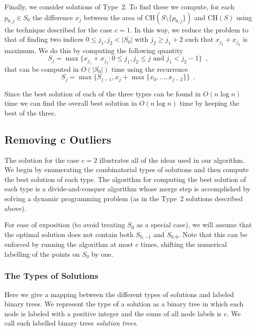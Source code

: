 \documentclass[lotsofwhite]{patmorin}
\newcommand{\ch}{\mathrm{CH}}
\begin{document}
Finally, we consider solutions of Type~2.  To find these we compute,
for each $p_{0,j}\in S_0$ the difference $x_j$ between the area of
$\ch(S\setminus\{p_{0,j}\})$ and $\ch(S)$ using the technique
described for the case $c=1$.  In this way, we reduce the problem to
that of finding two indices $0\le j_1,j_2< |S_0|$ with $j_2\ge j_1+2$
such that $x_{j_1}+x_{j_2}$ is maximum.  We do this by computing the
following quantity
\[
     S_j = \max\{x_{j_1}+x_{j_2} :
       \mbox{$0\le j_1,j_2\le j$ and $j_1 < j_2-1$}\} \enspace ,
\]
that can be computed in $O(|S_0|)$ time using the recurrence
\[
    S_j = \max\{S_{j-1}, x_{j} + \max\{x_{0},\ldots,x_{j-2}\}\}
                \enspace .
\]

Since the best solution of each of the three types can be found in
$O(n\log n)$ time we can find the overall best solution in $O(n\log
n)$ time by keeping the best of the three.

\subsection{Removing $\mathbf{c}$ Outliers}

The solution for the case $c=2$ illustrates all of the ideas used in 
our algorithm.  We begin by enumerating the combinatorial types of
solutions and then compute the best solution of each type.  The
algorithm for computing the best solution of each type is a
divide-and-conquer algorithm whose merge step is accomplished by
solving a dynamic programming problem (as in the Type~2 solutions
described above).

For ease of exposition (to avoid treating $S_0$ as a special case), we
will assume that the optimal solution does not contain both $S_{0,-1}$
and $S_{0,0}$.  Note that this can be enforced by running the
algorithm at most $c$ times, shifting the numerical labelling of the
points on $S_0$ by one.

\subsubsection{The Types of Solutions}

Here we give a mapping between the different types of solutions and
labeled binary trees. We represent the type of a solution as a binary
tree in which each node is labeled with a positive integer and the
sums of all node labels is $c$.  We call such labelled binary trees
\emph{solution trees}. 
\end{document}
